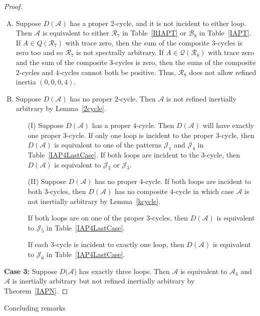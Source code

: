 \documentclass[10pt]{amsart}
\begin{document}
\begin{proof}
\begin{enumerate}[(A)]
		\item Suppose $D({\mathcal{A}})$ has a proper $2$-cycle, and it is not incident to either loop. Then ${\mathcal{A}}$ is
		equivalent to either ${\mathcal{R}}_7$ in Table~\ref{RIAPT} or ${\mathcal{B}}_8$
		in Table~\ref{IAPT}. If $A\in Q({\mathcal{R}}_7)$ with
		trace zero, then the sum of the composite $3$-cycles is zero too and
		so ${\mathcal{R}}_7$ is not spectrally arbitrary.  
		If $A\in{\mathcal{Q}}({\mathcal{R}}_8)$
		with trace zero and the sum of the composite $3$-cycles is zero, then
		the sums of the composite $2$-cycles and $4$-cycles cannot both
		be positive. Thus, ${\mathcal{R}}_8$ does not allow refined inertia $(0,0,0,4)$.
		\item Suppose $D({\mathcal{A}})$ has no proper $2$-cycle. Then ${\mathcal{A}}$ is not refined inertially
		arbitrary by Lemma~\ref{2cycle}.
		\begin{enumerate}
		\item[(I)] Suppose $D({\mathcal{A}})$ has a proper $4$-cycle. Then $D({\mathcal{A}})$ will have
		  exactly one proper $3$-cycle. If only one loop is incident to
		  the proper $3$-cycle, then $D({\mathcal{A}})$ is equivalent to one of the
		  patterns ${\mathcal{J}}_1$ and ${\mathcal{J}}_4$ in Table~\ref{IAP4LastCase}. If both loops are incident to the
		  $3$-cycle, then $D({\mathcal{A}})$ is equivalent to ${\mathcal{J}}_2$ or ${\mathcal{J}}_3$.
		\item[(II)] Suppose $D({\mathcal{A}})$ has no proper $4$-cycle. If both loops are incident
		to both $3$-cycles, then $D({\mathcal{A}})$ has no composite $4$-cycle in which
		case ${\mathcal{A}}$ is not inertially arbitrary by Lemma~\ref{kcycle}.  
		
		 
		 If both loops are on one of the proper $3$-cycles, then $D({\mathcal{A}})$
		 is equivalent to ${\mathcal{J}}_5$ in Table~\ref{IAP4LastCase}. 
		 
		 If each $3$-cycle is incident to exactly one loop, then $D({\mathcal{A}})$
		 is equivalent to ${\mathcal{J}}_6$ in Table~\ref{IAP4LastCase}.
		
		\end{enumerate}
			\end{enumerate}
			
			
		\textbf{Case 3:} Suppose $D({\mathcal{A}}$) has exactly three loops. Then ${\mathcal{A}}$ is equivalent to ${\mathcal{A}}_4$
		and ${\mathcal{A}}$ is inertially arbitrary but not refined inertially arbitrary by Theorem~\ref{IAPN}.	
			\hfill\end{proof}
{               
                                      {-3.5ex \@plus -1ex \@minus -.2ex}                                      {2.3ex \@plus.2ex}                                                      {\normalfont\bfseries}}{Concluding remarks}
\end{document}

